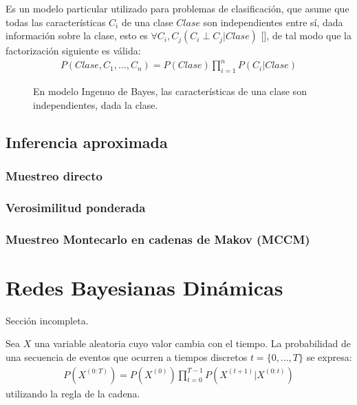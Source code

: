 Es un modelo particular utilizado para problemas de clasificación, que asume que todas las características $C_i$ de una clase $Clase$ son independientes entre sí, dada información sobre la clase, esto es $\forall C_i,C_j(C_i \perp C_j|Clase)$ [], de tal modo que la factorización siguiente es válida:
\begin{align}
 P(Clase,C_1,...,C_n) = P(Clase) \prod^n_{i=1}P(C_i|Clase)
\end{align}


\begin{figure}
 \centering
 \caption{En modelo Ingenuo de Bayes, las características de una clase son independientes, dada la clase.}\label{fig:naiveBayes}
\end{figure}



\subsection{Inferencia aproximada}
\subsubsection{Muestreo directo}
\subsubsection{Verosimilitud ponderada}
\subsubsection{Muestreo Montecarlo en cadenas de Makov (MCCM)}


\section{Redes Bayesianas Dinámicas}
{\color{red} Sección incompleta.}

Sea $X$ una variable aleatoria cuyo valor cambia con el tiempo.  La probabilidad de una secuencia de eventos que ocurren a tiempos discretos $t=\{0,...,T\}$ se expresa:
\begin{align*}
 P(X^{(0:T)}) = P(X^{(0)})\prod^{T-1}_{t=0}P(X^{(t+1)}|X^{(0:t)})
\end{align*}
utilizando la regla de la cadena.

